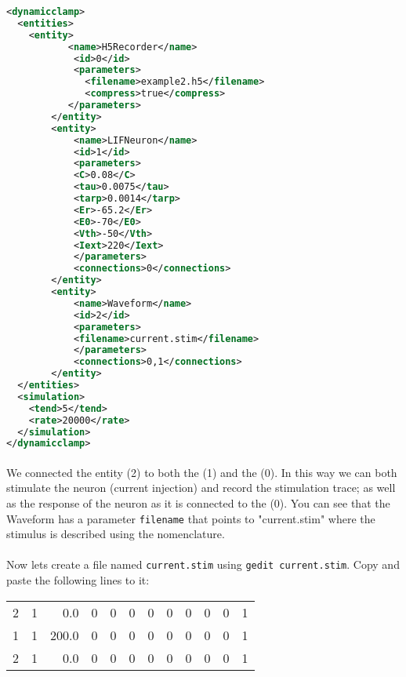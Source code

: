 \begin{lstlisting}[caption={Example of a configuration file with a the \nameref{entities:waveform} entity.},label={gettingStarted:example2}, language=XML,morekeywords={dynamic clamp,entities,entity,name,id,filename,compress,C,tau,tarp,Er,E0,Vth,Iext,parameters,connections,simulation,tend,rate}]
<dynamicclamp>
  <entities>
  	<entity>
 	       <name>H5Recorder</name>
        	<id>0</id>
        	<parameters>
		      <filename>example2.h5</filename>
		      <compress>true</compress>
	       </parameters>
    	</entity>
    	<entity>
      		<name>LIFNeuron</name>
      		<id>1</id>
      		<parameters>
			<C>0.08</C>
			<tau>0.0075</tau>
			<tarp>0.0014</tarp>
			<Er>-65.2</Er>
			<E0>-70</E0>
			<Vth>-50</Vth>
			<Iext>220</Iext>
      		</parameters>
      		<connections>0</connections>
    	</entity>
    	<entity>
      		<name>Waveform</name>
      		<id>2</id>
      		<parameters>
			<filename>current.stim</filename>
      		</parameters>
      		<connections>0,1</connections>
    	</entity>	
  </entities>
  <simulation>
  	<tend>5</tend>
   	<rate>20000</rate>
  </simulation>
</dynamicclamp>

\end{lstlisting}

\paragraph{}
We connected the  entity (2) to both the  (1) and the  (0). In this way we can both stimulate the neuron (current injection) and record the stimulation trace; as well as the response of the neuron as it is connected to the  (0).
You can see that the Waveform has a parameter \texttt{filename} that points to  "current.stim" where the stimulus is described using the  nomenclature.

\paragraph{}
Now lets create a file named \texttt{current.stim} using \texttt{gedit current.stim}. Copy and paste the following lines to it:
\begin{center}
\ttfamily
\begin{tabular}{rrrrrrrrrrrr}
2 & 1 & 0.0 & 0 & 0 & 0 & 0 & 0 & 0 & 0 &0 & 1 \\
1 & 1 & 200.0 & 0 & 0 & 0 & 0 & 0 & 0 & 0 & 0 & 1 \\
2 & 1 & 0.0 & 0 & 0 & 0 & 0 & 0 & 0 & 0 & 0 & 1 \\
\end{tabular}
\end{center}

